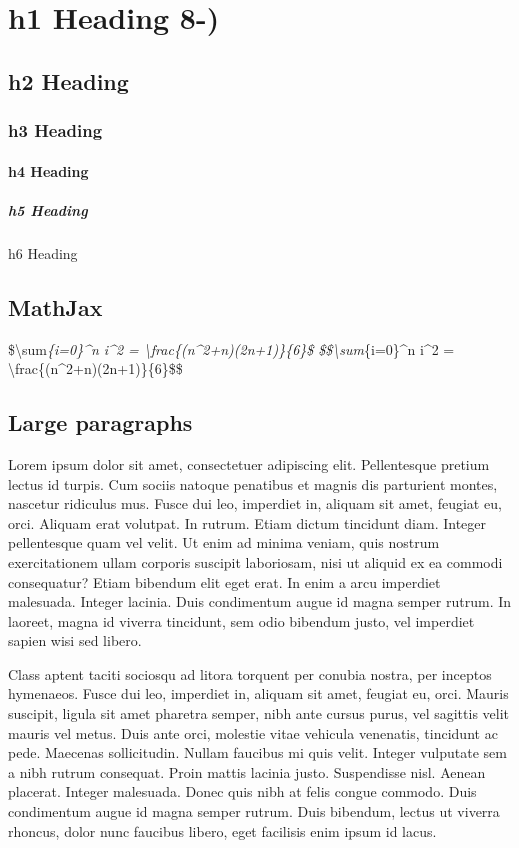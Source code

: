 \documentclass[]{article}
\date{}
\let\oldparagraph\paragraph
\renewcommand{\paragraph}[1]{\oldparagraph{#1}\mbox{}}
\let\oldsubparagraph\subparagraph
\renewcommand{\subparagraph}[1]{\oldsubparagraph{#1}\mbox{}}
\begin{document}
\section{h1 Heading 8-)}

\subsection{h2 Heading}

\subsubsection{h3 Heading}

\paragraph{h4 Heading}

\subparagraph{h5 Heading}

h6 Heading

\subsection{MathJax}

\$\textbackslash{}sum\emph{\{i=0\}\^{}n i\^{}2 =
\textbackslash{}frac\{(n\^{}2+n)(2n+1)\}\{6\}\$
\$\$\textbackslash{}sum}\{i=0\}\^{}n i\^{}2 =
\textbackslash{}frac\{(n\^{}2+n)(2n+1)\}\{6\}\$\$

\subsection{Large paragraphs}

Lorem ipsum dolor sit amet, consectetuer adipiscing elit. Pellentesque
pretium lectus id turpis. Cum sociis natoque penatibus et magnis dis
parturient montes, nascetur ridiculus mus. Fusce dui leo, imperdiet in,
aliquam sit amet, feugiat eu, orci. Aliquam erat volutpat. In rutrum.
Etiam dictum tincidunt diam. Integer pellentesque quam vel velit. Ut
enim ad minima veniam, quis nostrum exercitationem ullam corporis
suscipit laboriosam, nisi ut aliquid ex ea commodi consequatur? Etiam
bibendum elit eget erat. In enim a arcu imperdiet malesuada. Integer
lacinia. Duis condimentum augue id magna semper rutrum. In laoreet,
magna id viverra tincidunt, sem odio bibendum justo, vel imperdiet
sapien wisi sed libero.

Class aptent taciti sociosqu ad litora torquent per conubia nostra, per
inceptos hymenaeos. Fusce dui leo, imperdiet in, aliquam sit amet,
feugiat eu, orci. Mauris suscipit, ligula sit amet pharetra semper, nibh
ante cursus purus, vel sagittis velit mauris vel metus. Duis ante orci,
molestie vitae vehicula venenatis, tincidunt ac pede. Maecenas
sollicitudin. Nullam faucibus mi quis velit. Integer vulputate sem a
nibh rutrum consequat. Proin mattis lacinia justo. Suspendisse nisl.
Aenean placerat. Integer malesuada. Donec quis nibh at felis congue
commodo. Duis condimentum augue id magna semper rutrum. Duis bibendum,
lectus ut viverra rhoncus, dolor nunc faucibus libero, eget facilisis
enim ipsum id lacus.
\end{document}
